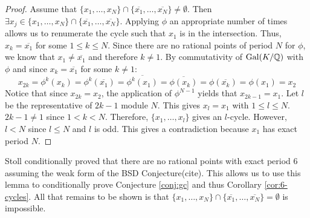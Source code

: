 \begin{proof}
	Assume that $\{x_1, \ldots, x_{N}\} \cap 
	\{\overline{x_1}, \ldots, \overline{x_{N}}\} \neq \emptyset$.
	Then $\exists x_j \in \{x_1, \ldots, x_{N}\} \cap 
	\{\overline{x_1}, \ldots, \overline{x_{N}}\}$. Applying $\phi$ 
	an appropriate number of times allows us to renumerate the cycle 
	such that $x_1$ is in the intersection. Thus, $x_k = \overline{x_1}$ 
	for some $1 \leq k \leq N$. Since there are no rational points of 
	period $N$ for $\phi$, we know that $x_1 \neq \overline{x_1}$ and 
	therefore $k \neq 1$. By commutativity of $\mathrm{Gal}(K/\mathbb{Q})$ with $\phi$
	and since $x_k = \overline{x_1}$ for some $k \neq 1$:
	\[
		x_{2k} = \phi^k(x_k) = \phi^k(\overline{x_1}) = \overline{\phi^k(x_1)}
		= \overline{\phi(x_k)} = \phi(\overline{x_k}) = \phi(x_1) = x_2
	\]
	Notice that since $x_{2k} = x_2$, the application of $\phi^{N-1}$
	yields	that $x_{2k-1} = x_1$. Let $l$ be the representative of $2k-1$
	module $N$. This gives $x_l = x_1$ with $1 \leq l \leq N$. $2k-1 \neq 1$ 
	since $1 < k < N$. Therefore, $\{x_1, \ldots, x_l\}$ gives an $l$-cycle.
	However, $l < N$ since $l \leq N$ and $l$ is odd. This gives a 
	contradiction because $x_1$ has exact period $N$.
\end{proof}

\begin{remark}[N = 6 case]
	Stoll conditionally proved that there are no rational points with exact
	period 6 assuming the weak form of the BSD Conjecture(cite). This allows
	us to use this lemma to conditionally prove Conjecture \ref{conj:gc} and thus
	Corollary \ref{cor:6-cycles}. All that remains to be shown is that 
	$\{x_1, \ldots, x_{N}\} \cap \{\overline{x_1}, \ldots, \overline{x_{N}}\} = 
	\emptyset$ is impossible.
\end{remark}


